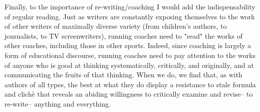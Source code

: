 Finally, to the importance of re-writing/coaching I would add the indispensability of regular reading. Just as writers are constantly exposing themselves to the work of other writers of maximally diverse variety (from children's authors, to journalists, to TV screenwriters), running coaches need to "read" the works of other coaches, including those in other sports. Indeed, since coaching is largely a form of educational discourse, running coaches need to pay attention to the works of anyone who is good at thinking systematically, critically, and originally, and at communicating the fruits of that thinking. When we do, we find that, as with authors of all types, the best at what they do display a resistance to stale formula and clichè that reveals an abiding willingness to critically examine and revise-- to re-write-- anything and everything.
